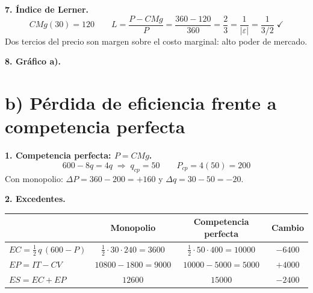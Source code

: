 \documentclass[11pt]{article}
\begin{document}
\textbf{7. Índice de Lerner.}
\[
CMg(30) = 120 \qquad L = \frac{P - CMg}{P} = \frac{360 - 120}{360} = \boxed{\frac{2}{3}} = \frac{1}{|\varepsilon|} = \frac{1}{3/2}\;\checkmark
\]
Dos tercios del precio son margen sobre el costo marginal: alto poder de mercado.

\textbf{8. Gráfico a).}

\begin{center}
\end{center}

\section*{b) Pérdida de eficiencia frente a competencia perfecta}

\textbf{1. Competencia perfecta: $P = CMg$.}
\[
600 - 8q = 4q \;\Rightarrow\; \boxed{q_{cp} = 50} \qquad P_{cp} = 4(50) = \boxed{200}
\]
Con monopolio: $\Delta P = 360 - 200 = +160$ \quad y \quad $\Delta q = 30 - 50 = -20$.

\textbf{2. Excedentes.}

\begin{center}
\renewcommand{\arraystretch}{1.5}
\begin{tabular}{@{}lccc@{}}
\toprule
 & Monopolio & Competencia perfecta & Cambio \\
\midrule
$EC = \tfrac12\,q\,(600 - P)$ & $\tfrac12\cdot 30\cdot 240 = 3600$ & $\tfrac12\cdot 50\cdot 400 = 10000$ & $-6400$ \\
$EP = IT - CV$ & $10800 - 1800 = 9000$ & $10000 - 5000 = 5000$ & $+4000$ \\
$ES = EC + EP$ & $12600$ & $15000$ & $-2400$ \\
\bottomrule
\end{tabular}
\end{center}
\end{document}
